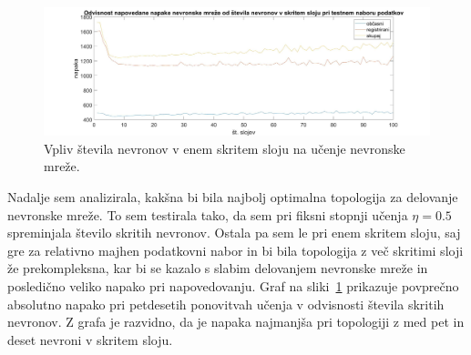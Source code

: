 \documentclass[mat1]{fmfdelo}
\begin{document}
\begin{figure}[!ht]
	\centering
	\includegraphics[width=1\textwidth]{lay.jpg}
	\caption{Vpliv števila nevronov v enem skritem sloju na učenje nevronske mreže.}
	\label{fig:lay}
\end{figure}
Nadalje sem analizirala, kakšna bi bila najbolj optimalna topologija za delovanje nevronske mreže. To sem testirala tako, da sem pri fiksni stopnji učenja $\eta = 0.5$ spreminjala število skritih nevronov. Ostala pa sem le pri enem skritem sloju, saj gre za relativno majhen podatkovni nabor in bi bila topologija z več skritimi sloji že prekompleksna, kar bi se kazalo s slabim delovanjem nevronske mreže in posledično veliko napako pri napovedovanju. 
Graf na sliki~\ref{fig:lay} prikazuje povprečno absolutno napako pri petdesetih ponovitvah učenja v odvisnosti števila skritih nevronov. Z grafa je razvidno, da je napaka najmanjša pri topologiji z med pet in deset nevroni v skritem sloju.
\end{document}
